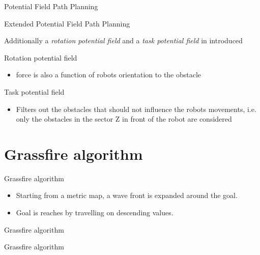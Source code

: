 \documentclass[compress]{beamer}
\begin{document}
\begin{frame}{Potential Field Path Planning}

Extended Potential Field Path Planning

Additionally a \emph{rotation potential field} and a \emph{task
potential field} in introduced

Rotation potential field

\begin{itemize}
\item force is also a function of robots orientation to the obstacle
\end{itemize}

Task potential field

\begin{itemize}
\item Filters out the obstacles that should not influence the robots
  movements, i.e. only the obstacles in the sector Z in front of the
  robot are considered
\end{itemize}

\end{frame}

\section{Grassfire algorithm}

\begin{frame}{Grassfire algorithm}

\begin{itemize}
\item Starting from a metric map, a wave front is expanded around the goal.
\item Goal is reaches by travelling on descending values.
\end{itemize}

\end{frame}

\begin{frame}{Grassfire algorithm}

\end{frame}

\begin{frame}{Grassfire algorithm}

\end{frame}
\end{document}
